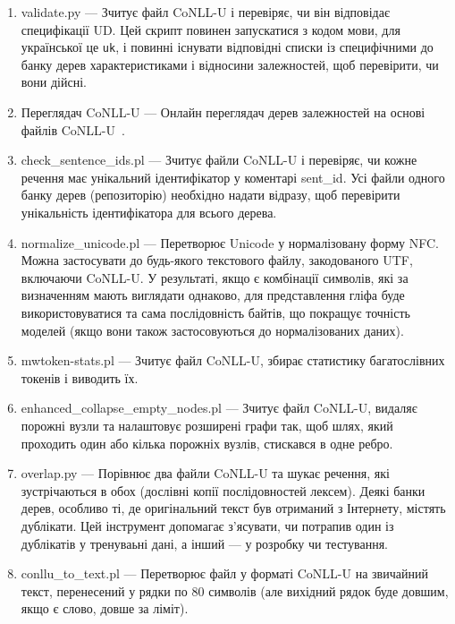 \begin{enumerate}
  \item validate.py --- Зчитує файл CoNLL-U і перевіряє, чи він відповідає
  специфікації UD. Цей скрипт повинен запускатися з кодом мови, для 
  української це \texttt{uk}, і повинні існувати відповідні списки із
  специфічними до банку дерев характеристиками і відносини залежностей, щоб 
  перевірити, чи вони дійсні.
  
  \item Переглядач CoNLL-U --- Онлайн переглядач дерев залежностей на основі
  файлів CoNLL-U~\cite{bib19}.
  
  \item check\_sentence\_ids.pl --- Зчитує файли CoNLL-U і перевіряє, чи кожне
  речення має унікальний ідентифікатор у коментарі sent\_id.
  Усі файли одного банку дерев (репозиторію) необхідно надати відразу, щоб
  перевірити унікальність ідентифікатора для всього дерева.
  
  \item normalize\_unicode.pl --- Перетворює Unicode у нормалізовану форму NFC.
  Можна застосувати до будь-якого текстового файлу, закодованого UTF,
  включаючи CoNLL-U. У результаті, якщо є комбінації символів, які за
  визначенням мають виглядати однаково, для представлення гліфа буде
  використовуватися та сама послідовність байтів, що покращує точність моделей
  (якщо вони також застосовуються до нормалізованих даних).
  
  \item mwtoken-stats.pl --- Зчитує файл CoNLL-U, збирає статистику багатослівних токенів і виводить їх.
  
  \item enhanced\_collapse\_empty\_nodes.pl --- Зчитує файл CoNLL-U, видаляє
  порожні вузли та налаштовує розширені графи так, щоб шлях, який проходить
  один або кілька порожніх вузлів, стискався в одне ребро.
  
  \item overlap.py --- Порівнює два файли CoNLL-U та шукає речення, які
  зустрічаються в обох (дослівні копії послідовностей лексем). Деякі банки
  дерев, особливо ті, де оригінальний текст був отриманий з Інтернету, містять
  дублікати. Цей інструмент допомагає з’ясувати, чи потрапив один із дублікатів у тренуваьні дані, а інший — у розробку чи тестування.
  
  \item conllu\_to\_text.pl --- Перетворює файл у форматі CoNLL-U на звичайний
  текст, перенесений у рядки по 80 символів 
  (але вихідний рядок буде довшим, якщо є слово, довше за ліміт).
  
\end{enumerate}

